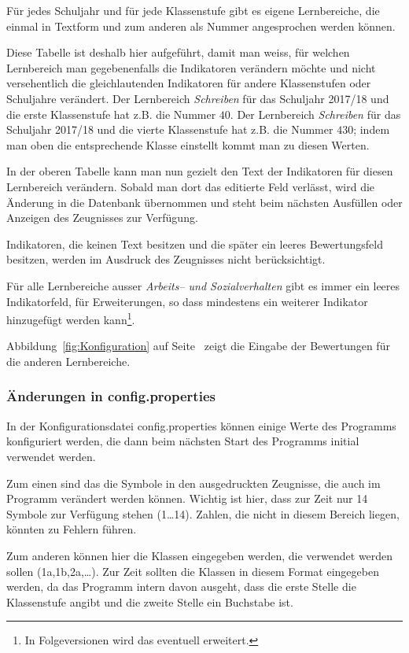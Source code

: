 \documentclass[a4paper,notitlepage,parskip]{scrartcl}
\newcommand\ott{\normalfont\ttfamily}
\begin{document}
Für jedes Schuljahr und für jede Klassenstufe gibt es eigene Lernbereiche, die einmal in Textform und zum anderen als Nummer angesprochen werden können.

Diese Tabelle ist deshalb hier aufgeführt, damit man weiss, für welchen Lernbereich man gegebenenfalls die Indikatoren verändern möchte und nicht versehentlich die gleichlautenden Indikatoren für andere Klassenstufen oder Schuljahre verändert. Der Lernbereich \emph{Schreiben} für das Schuljahr 2017/18 und die erste Klassenstufe hat z.B. die Nummer $40$.
Der Lernbereich \emph{Schreiben} für das Schuljahr 2017/18 und die vierte Klassenstufe hat z.B. die Nummer $430$; indem man oben die entsprechende Klasse einstellt kommt man zu diesen Werten.

In der oberen Tabelle kann man nun gezielt den Text der Indikatoren für diesen Lernbereich verändern. Sobald man dort das editierte Feld verlässt, wird die Änderung in die Datenbank übernommen und steht beim nächsten Ausfüllen oder Anzeigen des Zeugnisses zur Verfügung.

Indikatoren, die keinen Text besitzen und die später ein leeres Bewertungsfeld besitzen, werden im Ausdruck des Zeugnisses nicht berücksichtigt.

Für alle Lernbereiche ausser \emph{Arbeits-- und Sozialverhalten} gibt es immer ein leeres Indikatorfeld, für Erweiterungen, so dass mindestens ein weiterer Indikator hinzugefügt werden kann\footnote{In Folgeversionen wird das eventuell erweitert.}.

Abbildung~\ref{fig:Konfiguration} auf Seite~\pageref{fig:Konfiguration} zeigt die Eingabe der Bewertungen für die anderen Lernbereiche.

\subsubsection{Änderungen in {\ott config.properties}}
\label{configKlassen}
In der Konfigurationsdatei {\ott config.properties} können einige Werte des Programms konfiguriert werden, die dann beim nächsten Start des Programms initial verwendet werden.

Zum einen sind das die Symbole in den ausgedruckten Zeugnisse, die auch im Programm verändert werden können.
Wichtig ist hier, dass zur Zeit nur 14 Symbole zur Verfügung stehen (1\dots14). Zahlen, die nicht in diesem Bereich liegen, könnten zu Fehlern führen.

Zum anderen können hier die Klassen eingegeben werden, die verwendet werden sollen (1a,1b,2a,\dots).
Zur Zeit sollten die Klassen in diesem Format eingegeben werden, da das Programm intern davon ausgeht, dass die erste Stelle die Klassenstufe angibt und die zweite Stelle ein Buchstabe ist.
\end{document}
